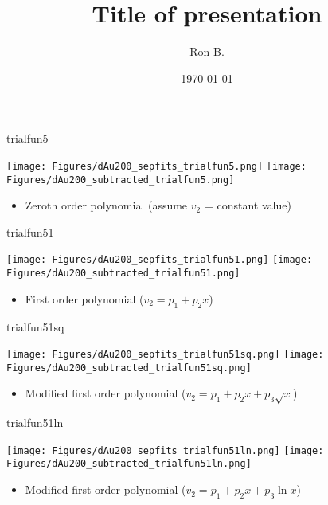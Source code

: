 \documentclass[aspectratio=169,compress,10pt]{beamer}
\title[Title of presentation]{Title of presentation}
\author[Ron B.]{Ron B.}
\institute[UNCG]{\normalsize University of North Carolina Greensboro}
\date[\today]{\today}
\begin{document}


\begin{frame}{trialfun5}
\begin{center}
\texttt{[image: Figures/dAu200\_sepfits\_trialfun5.png]}
\texttt{[image: Figures/dAu200\_subtracted\_trialfun5.png]}
\end{center}
\begin{itemize}
\item Zeroth order polynomial (assume $v_2$ = constant value)
\end{itemize}
\end{frame}




\begin{frame}{trialfun51}
\begin{center}
\texttt{[image: Figures/dAu200\_sepfits\_trialfun51.png]}
\texttt{[image: Figures/dAu200\_subtracted\_trialfun51.png]}
\end{center}
\begin{itemize}
\item First order polynomial ($v_2 = p_1 + p_2x$)
\end{itemize}
\end{frame}




\begin{frame}{trialfun51sq}
\begin{center}
\texttt{[image: Figures/dAu200\_sepfits\_trialfun51sq.png]}
\texttt{[image: Figures/dAu200\_subtracted\_trialfun51sq.png]}
\end{center}
\begin{itemize}
\item Modified first order polynomial ($v_2 = p_1 + p_2x + p_3\sqrt{x}$)
\end{itemize}
\end{frame}






\begin{frame}{trialfun51ln}
\begin{center}
\texttt{[image: Figures/dAu200\_sepfits\_trialfun51ln.png]}
\texttt{[image: Figures/dAu200\_subtracted\_trialfun51ln.png]}
\end{center}
\begin{itemize}
\item Modified first order polynomial ($v_2 = p_1 + p_2x + p_3\ln x$)
\end{itemize}
\end{frame}
\end{document}
